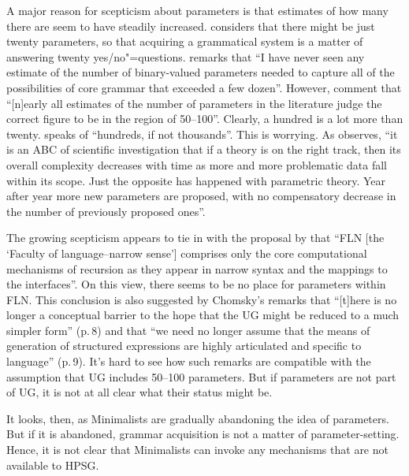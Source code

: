 \documentclass[output=paper
                ,modfonts
                ,nonflat
	        ,collection
	        ,collectionchapter
	        ,collectiontoclongg
 	        ,biblatex
                ,babelshorthands
                ,newtxmath
                ,draftmode
                ,colorlinks, citecolor=brown
]{./langsci/langscibook}
\begin{document}
A major reason for scepticism about parameters is that estimates of how many there are seem to have
steadily increased. \citet[]{Fodor2001a-u} considers that there might be just twenty parameters, so that
acquiring a grammatical system is a matter of answering twenty yes/no"=questions. \citet[]{Newmeyer2005a} remarks that ``I have never seen any estimate of the number of binary-valued
parameters needed to capture all of the possibilities of core grammar that exceeded a few
dozen''. However, \citet{RH2005a} comment that ``[n]early all estimates of the number of
parameters in the literature judge the correct figure to be in the region of 50--100''. Clearly, a
hundred is a lot more than twenty. \citet[Section~6.3]{Newmeyer2017a} speaks of ``hundreds, if not thousands''.
This is worrying. As \citet[]{Newmeyer2006a-u} observes, ``it
is an ABC of scientific investigation that if a theory is on the right track, then its overall
complexity decreases with time as more and more problematic data fall within its scope. Just the
opposite has happened with parametric theory. Year after year more new parameters are proposed, with
no compensatory decrease in the number of previously proposed ones''.

The growing scepticism appears to tie in with the proposal by \citet*[]{HCF2002a}
that ``FLN [the `Faculty of language--narrow sense'] comprises only the core computational mechanisms of
recursion as they appear in narrow syntax and the mappings to the interfaces''. On this view, there
seems to be no place for parameters within FLN. This conclusion is also suggested by Chomsky’s
remarks \citeyearpar{Chomsky2005a} that ``[t]here is no longer a conceptual barrier to the hope that the UG
might be reduced to a much simpler form'' (p.\,8) and that ``we need no longer assume that
the means of generation of structured expressions are highly articulated and specific to language''
(p.\,9). It’s hard to see how such remarks are compatible with the assumption that UG includes 50--100
parameters. But if parameters are not part of UG, it is not at all clear what their status might be.

It looks, then, as Minimalists are gradually abandoning the idea of parameters. But if it is
abandoned, grammar acquisition is not a matter of parameter-setting. Hence, it is not clear that
Minimalists can invoke any mechanisms that are not available to HPSG.
\end{document}
